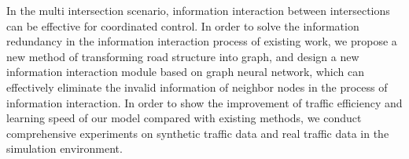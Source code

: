 \begin{abstractEn}
In the multi intersection scenario, information interaction between intersections can be effective for coordinated control. In order to solve the information redundancy in the information interaction process of existing work, we propose a new method of transforming road structure into graph, and design a new information interaction module based on graph neural network, which can effectively eliminate the invalid information of neighbor nodes in the process of information interaction. In order to show the improvement of traffic efficiency and learning speed of our model compared with existing methods, we conduct comprehensive experiments on synthetic traffic data and real traffic data in the simulation environment.

\end{abstractEn}



\usepackage{subfig}
\usepackage{rotating}
\usepackage[usenames,dvipsnames]{xcolor}
\usepackage{tikz}
\usepackage{pgfplots}
\pgfplotsset{compat=1.16}
\usepackage{ifthen}
\usepackage{longtable}
\usepackage{siunitx}
\usepackage{listings}
\usepackage{multirow}
\usepackage{pifont}

\usepackage{algorithm}  
\usepackage{algorithmicx}
\usepackage{algpseudocode}  
\usepackage{amsmath}  
\renewcommand{\algorithmicrequire}{\textbf{输入:}}
\renewcommand{\algorithmicensure}{\textbf{输出:}}

\newcommand{\cndash}{\rule{0.2em}{0pt}\rule[0.35em]{1.6em}{0.05em}\rule{0.2em}{0pt}}

\makeatletter
\newenvironment{breakablealgorithm}
  {%
   \begin{center}
     \refstepcounter{algorithm}%
     \hrule height.8pt depth0pt \kern2pt%
     \renewcommand{\caption}[2][\relax]{%
       {\raggedright\textbf{\ALG@name~\thealgorithm} ##2\par}%
       \ifx\relax##1\relax %
         \addcontentsline{loa}{algorithm}{\protect\numberline{\thealgorithm}##2}%
       \else %
         \addcontentsline{loa}{algorithm}{\protect\numberline{\thealgorithm}##1}%
       \fi
       \kern2pt\hrule\kern2pt
     }
  }{%
     \kern2pt\hrule\relax%
   \end{center}
  }
\makeatother

